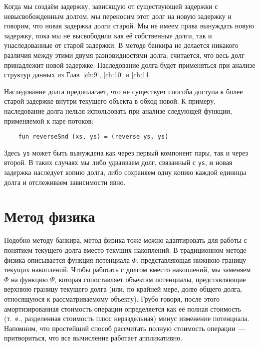 Когда мы создаём задержку, зависящую от существующей задержки с
невысвобожденным долгом, мы переносим этот долг на новую задержку и
говорим, что новая задержка  долги
старой. Мы не имеем права вынуждать новую задержку, пока мы не
высвободили как её собственные долги, так и унаследованные от старой
задержки. В методе банкира не делается никакого различия между этими
двумя разновидностями долга; считается, что весь долг принадлежит
новой задержке. Наследование долга будет применяться при анализе
структур данных из Глав~\ref{ch:9}, \ref{ch:10} и \ref{ch:11}.

\begin{remark}
  Наследование долга предполагает, что не существует способа доступа к
  более старой задержке внутри текущего объекта в обход новой. К
  примеру, наследование долга нельзя использовать при анализе следующей
  функции, применяемой к паре потоков:
  \begin{lstlisting}
    fun reverseSnd (xs, ys) = (reverse ys, ys)
  \end{lstlisting}
  Здесь \lstinline!ys! может быть вынуждена как через первый компонент
  пары, так и через второй. В таких случаях мы либо удваиваем долг,
  связанный с \lstinline!ys!, и новая задержка наследует копию долга,
  либо сохраняем одну копию каждой единицы долга и отслеживаем
  зависимости явно.
\end{remark}

\section{Метод физика}
\label{sc:6.4}

Подобно методу банкира, метод физика тоже можно адаптировать для работы
с понятием текущего долга вместо текущих накоплений.  В традиционном
методе физика описывается функция потенциала $\Phi$, представляющая
нижнюю границу текущих накоплений. Чтобы работать с долгом вместо
накоплений, мы заменяем $\Phi$ на функцию $\Psi$, которая сопоставляет
объектам потенциалы, представляющие верхнюю границу текущего долга
(или, по крайней мере, долю общего долга, относящуюся к
рассматриваемому объекту).  Грубо говоря, после этого амортизированная
стоимость операции определяется как её полная стоимость (т.~е.,
разделенная стоимость плюс нераздельная) минус изменение
потенциала. Напомним, что простейший способ рассчитать полную
стоимость операции~--- притвориться, что все вычисление работает
аппликативно.

